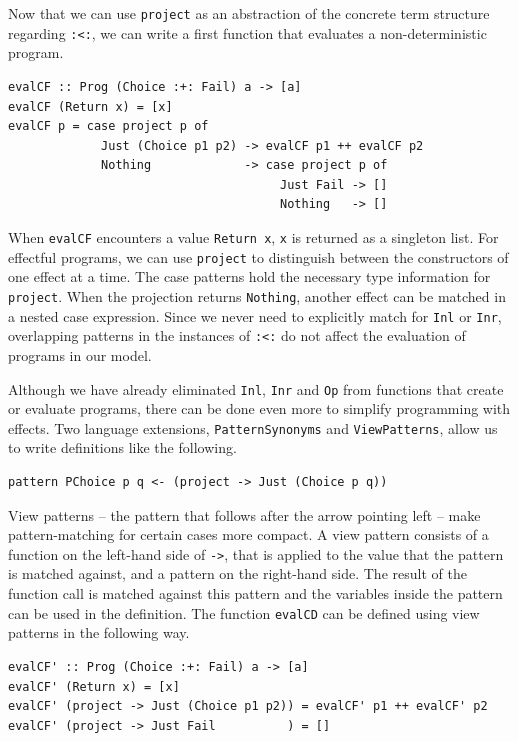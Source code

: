 \documentclass[a4paper, 11pt, fleqn, twoside]{scrreprt}
\newcommand{\hinl}[1]{\texttt{#1}}
\begin{document}
Now that we can use \hinl{project} as an abstraction of the concrete term structure regarding \hinl{:<:}, we can write a first function that evaluates a non-deterministic program.

\begin{verbatim}
evalCF :: Prog (Choice :+: Fail) a -> [a]
evalCF (Return x) = [x]
evalCF p = case project p of
             Just (Choice p1 p2) -> evalCF p1 ++ evalCF p2
             Nothing             -> case project p of
                                      Just Fail -> []
                                      Nothing   -> []
\end{verbatim}

When \hinl{evalCF} encounters a value \hinl{Return x}, \hinl{x} is returned as a singleton list.
For effectful programs, we can use \hinl{project} to distinguish between the constructors of one effect at a time.
The case patterns hold the necessary type information for \hinl{project}.
When the projection returns \hinl{Nothing}, another effect can be matched in a nested case expression.
Since we never need to explicitly match for \hinl{Inl} or \hinl{Inr}, overlapping patterns in the instances of \hinl{:<:} do not affect the evaluation of programs in our model.

Although we have already eliminated \hinl{Inl}, \hinl{Inr} and \hinl{Op} from functions that create or evaluate programs, there can be done even more to simplify programming with effects.
Two language extensions, \hinl{PatternSynonyms} and \hinl{ViewPatterns}, allow us to write definitions like the following.

\begin{verbatim}
pattern PChoice p q <- (project -> Just (Choice p q))
\end{verbatim}

View patterns -- the pattern that follows after the arrow pointing left -- make pattern-matching for certain cases more compact.
A view pattern consists of a function on the left-hand side of \hinl{->}, that is applied to the value that the pattern is matched against, and a pattern on the right-hand side.
The result of the function call is matched against this pattern and the variables inside the pattern can be used in the definition.
The function \hinl{evalCD} can be defined using view patterns in the following way.

\begin{verbatim}
evalCF' :: Prog (Choice :+: Fail) a -> [a]
evalCF' (Return x) = [x]
evalCF' (project -> Just (Choice p1 p2)) = evalCF' p1 ++ evalCF' p2
evalCF' (project -> Just Fail          ) = []
\end{verbatim}
\end{document}
